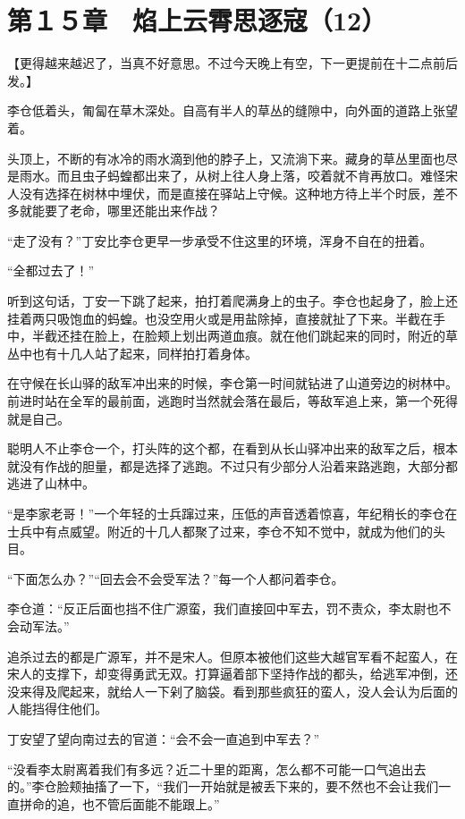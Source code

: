 \section{第１５章　焰上云霄思逐寇（12）}

【更得越来越迟了，当真不好意思。不过今天晚上有空，下一更提前在十二点前后发。】

李仓低着头，匍匐在草木深处。自高有半人的草丛的缝隙中，向外面的道路上张望着。

头顶上，不断的有冰冷的雨水滴到他的脖子上，又流淌下来。藏身的草丛里面也尽是雨水。而且虫子蚂蝗都出来了，从树上往人身上落，咬着就不肯再放口。难怪宋人没有选择在树林中埋伏，而是直接在驿站上守候。这种地方待上半个时辰，差不多就能要了老命，哪里还能出来作战？

“走了没有？”丁安比李仓更早一步承受不住这里的环境，浑身不自在的扭着。

“全都过去了！”

听到这句话，丁安一下跳了起来，拍打着爬满身上的虫子。李仓也起身了，脸上还挂着两只吸饱血的蚂蝗。也没空用火或是用盐除掉，直接就扯了下来。半截在手中，半截还挂在脸上，在脸颊上划出两道血痕。就在他们跳起来的同时，附近的草丛中也有十几人站了起来，同样拍打着身体。

在守候在长山驿的敌军冲出来的时候，李仓第一时间就钻进了山道旁边的树林中。前进时站在全军的最前面，逃跑时当然就会落在最后，等敌军追上来，第一个死得就是自己。

聪明人不止李仓一个，打头阵的这个都，在看到从长山驿冲出来的敌军之后，根本就没有作战的胆量，都是选择了逃跑。不过只有少部分人沿着来路逃跑，大部分都逃进了山林中。

“是李家老哥！”一个年轻的士兵蹿过来，压低的声音透着惊喜，年纪稍长的李仓在士兵中有点威望。附近的十几人都聚了过来，李仓不知不觉中，就成为他们的头目。

“下面怎么办？”“回去会不会受军法？”每一个人都问着李仓。

李仓道：“反正后面也挡不住广源蛮，我们直接回中军去，罚不责众，李太尉也不会动军法。”

追杀过去的都是广源军，并不是宋人。但原本被他们这些大越官军看不起蛮人，在宋人的支撑下，却变得勇武无双。打算逼着部下坚持作战的都头，给逃军冲倒，还没来得及爬起来，就给人一下剁了脑袋。看到那些疯狂的蛮人，没人会认为后面的人能挡得住他们。

丁安望了望向南过去的官道：“会不会一直追到中军去？”

“没看李太尉离着我们有多远？近二十里的距离，怎么都不可能一口气追出去的。”李仓脸颊抽搐了一下，“我们一开始就是被丢下来的，要不然也不会让我们一直拼命的追，也不管后面能不能跟上。”

